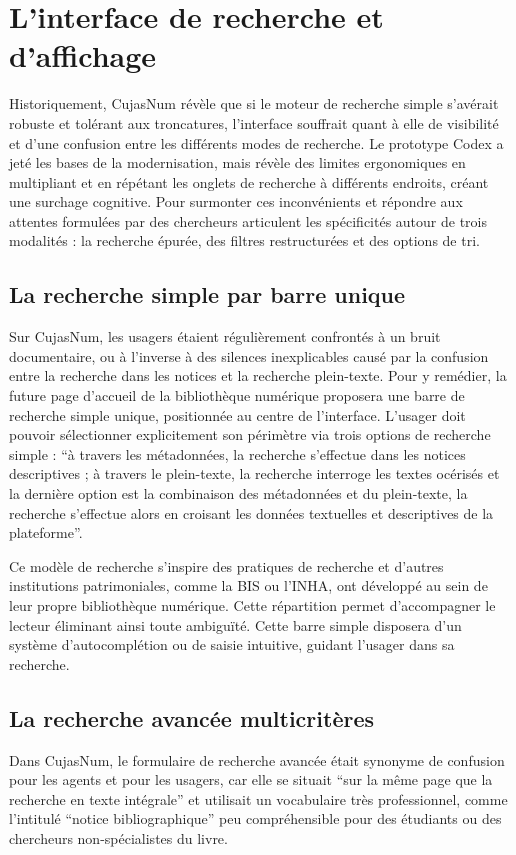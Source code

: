 \section{L'interface de recherche et d'affichage}
Historiquement, CujasNum révèle que si le moteur de recherche simple s'avérait robuste et tolérant aux troncatures, l'interface souffrait quant à elle de visibilité et d'une confusion entre les différents modes de recherche. Le prototype Codex a jeté les bases de la modernisation, mais révèle des limites ergonomiques en multipliant et en répétant les onglets de recherche à différents endroits, créant une surchage cognitive. Pour surmonter ces inconvénients et répondre aux attentes formulées par des chercheurs articulent les spécificités autour de trois modalités : la recherche épurée, des filtres restructurées et des options de tri.

\subsection{La recherche simple par barre unique}
Sur CujasNum, les usagers étaient régulièrement confrontés à un bruit documentaire, ou à l'inverse à des silences inexplicables causé par la confusion entre la recherche dans les notices et la recherche plein-texte. Pour y remédier, la future page d'accueil de la bibliothèque numérique proposera une barre de recherche simple unique, positionnée au centre de l'interface. L'usager doit pouvoir sélectionner explicitement son périmètre via trois options de recherche simple : \enquote{à travers les métadonnées, la recherche s'effectue dans les notices descriptives ; à travers le plein-texte, la recherche interroge les textes océrisés et la dernière option est la combinaison des métadonnées et du plein-texte, la recherche s'effectue alors en croisant les données textuelles et descriptives de la plateforme}.

Ce modèle de recherche s'inspire des pratiques de recherche et d'autres institutions patrimoniales, comme la BIS ou l'INHA, ont développé au sein de leur propre bibliothèque numérique. Cette répartition permet d'accompagner le lecteur éliminant ainsi toute ambiguïté. Cette barre simple disposera d'un système d'autocomplétion ou de saisie intuitive, guidant l'usager dans sa recherche.

\subsection{La recherche avancée multicritères}
Dans CujasNum, le formulaire de recherche avancée était synonyme de confusion pour les agents et pour les usagers, car elle se situait \enquote{sur la même page que la recherche en texte intégrale} et utilisait un vocabulaire très professionnel, comme l'intitulé \enquote{notice bibliographique} peu compréhensible pour des étudiants ou des chercheurs non-spécialistes du livre.

